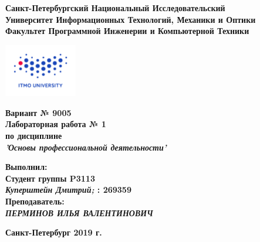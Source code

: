 \documentclass[11pt]{article}
\author{АВТОР}
\date{\today}
\title{}
\begin{document}
\large
\thispagestyle{empty}
\begin{center}
\textbf{Санкт-Петербургский Национальный Исследовательский}\\
\textbf{Университет Информационных Технологий, Механики и Оптики}\\
\textbf{Факультет Программной Инженерии и Компьютерной Техники}\\
\end{center}
\vspace{1em}
\begin{center}
\includegraphics[width=120px]{../../../itmo-logo.png}
\end{center}
\LARGE
\vspace{5em}
\begin{center}
\textbf{Вариант № 9005}\\
\textbf{Лабораторная работа № 1}\\
\Large
\textbf{по дисциплине}\\
\LARGE
\textbf{\emph{'Основы профессиональной деятельности'}}\\
\end{center}
\vspace{11em}
\large
\begin{flushright}
\textbf{Выполнил:}\\
\textbf{Студент группы P3113}\\
\textbf{\emph{Куперштейн Дмитрий;} : 269359}\\
\textbf{Преподаватель:}\\
\textbf{\emph{ПЕРМИНОВ ИЛЬЯ ВАЛЕНТИНОВИЧ}}\\
\end{flushright}
\vspace{4em}
\large
\begin{center}
\textbf{Санкт-Петербург 2019 г.}
\end{center}
\pagebreak{}

\setcounter{tocdepth}{2}
\tableofcontents
\vspace{2em}
\pagebreak{}
\end{document}

